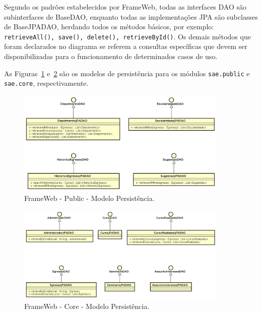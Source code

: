 Segundo os padrões estabelecidos por FrameWeb, todas as interfaces DAO são subinterfaces de BaseDAO, enquanto todas as implementações JPA são subclasses de BaseJPADAO, herdando todos os métodos básicos, por exemplo: \texttt{retrieveAll(), save(), delete(), retrieveById()}. Os demais métodos que foram declarados no diagrama se referem a consultas específicas que devem ser disponibilizadas para o funcionamento de determinados casos de uso. 

As Figuras~\ref{fig-projeto-public-modelo-persistencia} e~\ref{fig-projeto-core-modelo-persistencia} são os modelos de persistência para os módulos \texttt{sae.public}  e \texttt{sae.core}, respectivamente.

\begin{figure}[h]
	\centering
	\includegraphics[width=0.9\textwidth]{figuras/projeto/fig-projeto-public-modelo-persistencia}
	\caption{FrameWeb - Public - Modelo Persistência.}
	\label{fig-projeto-public-modelo-persistencia}
\end{figure}


\begin{figure}[h]
	\centering
	\includegraphics[width=0.9\textwidth]{figuras/projeto/fig-projeto-core-modelo-persistencia}
	\caption{FrameWeb - Core - Modelo Persistência.}
	\label{fig-projeto-core-modelo-persistencia}
\end{figure}



